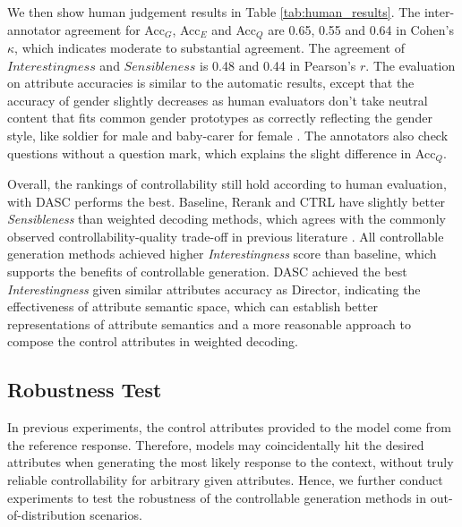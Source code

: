 We then show human judgement results in Table \ref{tab:human_results}. The inter-annotator agreement for Acc$_G$, Acc$_E$ and Acc$_Q$ are 0.65, 0.55 and 0.64 in Cohen's $\kappa$, which indicates moderate to substantial agreement. The agreement of $Interestingness$ and $Sensibleness$ is 0.48 and 0.44 in Pearson's $r$. The evaluation on attribute accuracies is similar to the automatic results, except that the accuracy of gender slightly decreases as human evaluators don't take neutral content that fits common gender prototypes as correctly reflecting the gender style, like soldier for male and baby-carer for female \citep{bolukbasi2016man}. The annotators also check questions without a question mark, which explains the slight difference in Acc$_Q$.

Overall, the rankings of controllability still hold according to human evaluation, with DASC performs the best. Baseline, Rerank and CTRL have slightly better \textit{Sensibleness} than weighted decoding methods, which agrees with the commonly observed controllability-quality trade-off in previous literature \citep{dathathri2019plug,yang2021fudge,qian2022controllable}. All controllable generation methods achieved higher \textit{Interestingness} score than baseline, which supports the benefits of controllable generation. DASC achieved the best \textit{Interestingness} given similar attributes accuracy as Director, indicating the effectiveness of attribute semantic space, which can establish better representations of attribute semantics and a more reasonable approach to compose the control attributes in weighted decoding. 


\subsection{Robustness Test}
In previous experiments, the control attributes provided to the model come from the reference response. Therefore, models may coincidentally hit the desired attributes when generating the most likely response to the context, without truly reliable controllability for arbitrary given attributes. Hence, we further conduct experiments to test the robustness of the controllable generation methods in out-of-distribution scenarios. 

